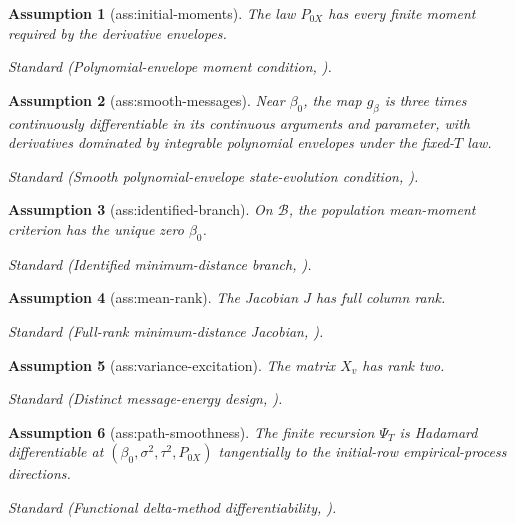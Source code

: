 \documentclass{article}
\newtheorem{assumption}{Assumption}
\begin{document}
\begin{assumption}[ass:initial-moments]\label{ass:initial-moments}
The law \(P_{0X}\) has every finite moment required by the derivative envelopes.
\par\smallskip\noindent\emph{Standard} (Polynomial-envelope moment condition, \cite{ShiraniBayati2024CausalMP}).
\end{assumption}

\begin{assumption}[ass:smooth-messages]\label{ass:smooth-messages}
Near \(\beta_0\), the map \(g_\beta\) is three times continuously differentiable in its continuous arguments and parameter, with derivatives dominated by integrable polynomial envelopes under the fixed-\(T\) law.
\par\smallskip\noindent\emph{Standard} (Smooth polynomial-envelope state-evolution condition, \cite{RushVenkataramanan2018FiniteSampleAMP}).
\end{assumption}

\begin{assumption}[ass:identified-branch]\label{ass:identified-branch}
On \(\mathcal B\), the population mean-moment criterion has the unique zero \(\beta_0\).
\par\smallskip\noindent\emph{Standard} (Identified minimum-distance branch, \cite{NeweyMcFadden1994LargeSample}).
\end{assumption}

\begin{assumption}[ass:mean-rank]\label{ass:mean-rank}
The Jacobian \(J\) has full column rank.
\par\smallskip\noindent\emph{Standard} (Full-rank minimum-distance Jacobian, \cite{NeweyMcFadden1994LargeSample}).
\end{assumption}

\begin{assumption}[ass:variance-excitation]\label{ass:variance-excitation}
The matrix \(X_v\) has rank two.
\par\smallskip\noindent\emph{Standard} (Distinct message-energy design, \cite{ShiraniBayati2024CausalMP}).
\end{assumption}

\begin{assumption}[ass:path-smoothness]\label{ass:path-smoothness}
The finite recursion \(\Psi_T\) is Hadamard differentiable at \((\beta_0,\sigma^2,\tau^2,P_{0X})\) tangentially to the initial-row empirical-process directions.
\par\smallskip\noindent\emph{Standard} (Functional delta-method differentiability, \cite{VanDerVaartWellner1996WeakConvergence}).
\end{assumption}
\end{document}
